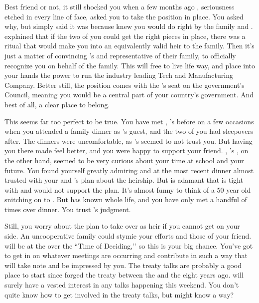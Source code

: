 \documentclass[char]{GL2020}
\begin{document}
Best friend or not, it still shocked you when a few months ago \cHeir{}, seriousness etched in every line of \cHeir{\their} face, asked you to take the position in \cHeir{\their} place. You asked \cHeir{\them} why, but \cHeir{\they} simply said it was because \cHeir{\they} knew you would do right by the family and \cTechGod{}. \cHeir{} explained that if the two of you could get the right pieces in place, there was a ritual that would make you into an equivalently valid heir to the family. Then it's just a matter of convincing \cHeir{}’s \cDiplomat{\auncle} and representative of their family, \cDiplomat{\full} to officially recognize you on behalf of the family. This will free \cHeir{} to live life \cHeir{\their} way, and place into your hands the power to run the industry leading \cHeir{\formal} Tech and Manufacturing Company. Better still, the position comes with the \cHeir{\formal}'s seat on the government's Council, meaning you would be a central part of your country's government. And best of all, a clear place to belong.

This seems far too perfect to be true. You have met \cFaldeonParent{\full}, \cHeir{}’s \cFaledonParent{\parent} before on a few occasions when you attended a \cHeir{\formal} family dinner as \cHeir{}’s guest, and the two of you had sleepovers after. The dinners were uncomfortable, as \cHeir’s{} \cFaledonParent{\parent} seemed to not trust you. But having you there made \cHeir{} feel better, and you were happy to support your friend. \cDiplomat{\full}, \cHeir{}’s \cDipomat{\auncle}, on the other hand, seemed to be very curious about your time at school and your future. You found yourself greatly admiring \cDiplomat{\them} and at the most recent dinner almost trusted \cDiplomat{\them} with your and \cHeir{}’s plan about the heirship. But \cHeir{} is adamant that \cDiplomat{} is tight with \cDiplomat{\their} \cFaledonParent{\sibling} and would not support the plan. It’s almost funny to think of a 50 year old \cDiplomat{\person} snitching on \cDiplomat{\their} \cHeir{\nibling} to \cHeir{\their} \cFaledonParent{\parent}. But \cHeir{} has known \cDiplomat{} \cHeir{\their} whole life, and you have only met \cDiplomat{} a handful of times over dinner. You trust \cHeir{}’s judgment.

Still, you worry about the plan to take over as heir if you cannot get \cDiplomat{} on your side. An uncooperative \cHeir{\formal} family could stymie your efforts and those of your friend. \cDiplomat{} will be at the \pSchool{} over the ``Time of Deciding,’’ so this is your big chance. You've got to get in on whatever meetings are occurring and contribute in such a way that \cDiplomat{} will take note and be impressed by you. The treaty talks are probably a good place to start since \cDiplomat{\they} forged the treaty between the \pTech{} and the \pFarm{} eight years ago. \cDiplomat{\They} will surely have a vested interest in any talks happening this weekend.  You don’t quite know how to get involved in the treaty talks, but \cHeir{} might know a way?
\end{document}
